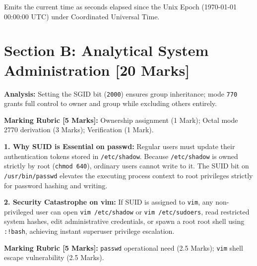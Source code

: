 \begin{examsol}
Emits the current time as seconds elapsed since the Unix Epoch (1970-01-01 00:00:00 UTC) under Coordinated Universal Time.
\end{examsol}

\section*{Section B: Analytical System Administration [20 Marks]}


\begin{examsol}
\textbf{Analysis:} Setting the SGID bit (\texttt{2000}) ensures group inheritance; mode \texttt{770} grants full control to owner and group while excluding others entirely.

\begin{markingrubric}
\textbf{Marking Rubric [5 Marks]:} Ownership assignment (1 Mark); Octal mode 2770 derivation (3 Marks); Verification (1 Mark).
\end{markingrubric}
\end{examsol}


\begin{examsol}
\textbf{1. Why SUID is Essential on passwd:}
Regular users must update their authentication tokens stored in \texttt{/etc/shadow}. Because \texttt{/etc/shadow} is owned strictly by root (\texttt{chmod 640}), ordinary users cannot write to it. The SUID bit on \texttt{/usr/bin/passwd} elevates the executing process context to root privileges strictly for password hashing and writing.

\textbf{2. Security Catastrophe on vim:}
If SUID is assigned to \texttt{vim}, any non-privileged user can open \texttt{vim /etc/shadow} or \texttt{vim /etc/sudoers}, read restricted system hashes, edit administrative credentials, or spawn a root root shell using \texttt{:!bash}, achieving instant superuser privilege escalation.

\begin{markingrubric}
\textbf{Marking Rubric [5 Marks]:} \texttt{passwd} operational need (2.5 Marks); \texttt{vim} shell escape vulnerability (2.5 Marks).
\end{markingrubric}
\end{examsol}

